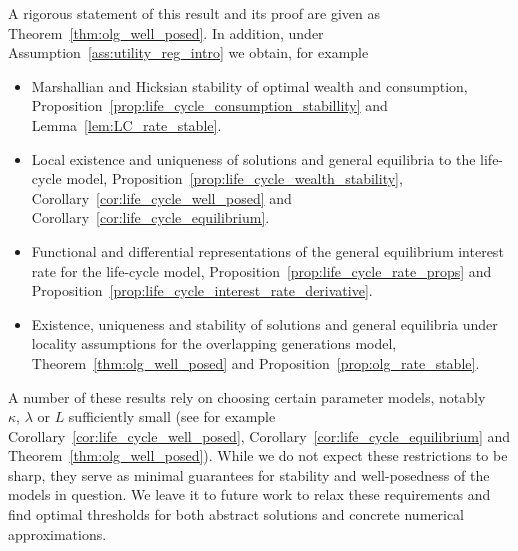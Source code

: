 \documentclass[11pt,oneside,english,reqno,dvipsnames,table]{amsart}
\numberwithin{equation}{section}
\theoremstyle{plain}
\theoremstyle{definition}
\theoremstyle{remark}
\theoremstyle{plain}
\theoremstyle{plain}
\theoremstyle{plain}
\theoremstyle{plain}
\theoremstyle{plain}
\theoremstyle{plain}
\theoremstyle{plain}
\numberwithin{thm}{section}
\begin{document}
%
A rigorous statement of this result and its proof are given as Theorem~\ref{thm:olg_well_posed}. In addition, under Assumption~\ref{ass:utility_reg_intro} we obtain, for example
%
\begin{itemize}
    \item Marshallian and Hicksian stability of optimal wealth and consumption, Proposition~\ref{prop:life_cycle_consumption_stabillity} and Lemma~\ref{lem:LC_rate_stable}.
    \item Local existence and uniqueness of solutions and general equilibria to the life-cycle model, Proposition~\ref{prop:life_cycle_wealth_stability},  Corollary~\ref{cor:life_cycle_well_posed} and Corollary~\ref{cor:life_cycle_equilibrium}.
    \item Functional and differential representations of the general equilibrium interest rate for the life-cycle model, Proposition~\ref{prop:life_cycle_rate_props} and Proposition~\ref{prop:life_cycle_interest_rate_derivative}.
    \item Existence, uniqueness and stability of solutions and general equilibria under locality assumptions for the overlapping generations model, Theorem~\ref{thm:olg_well_posed} and Proposition~\ref{prop:olg_rate_stable}.
\end{itemize}
%
A number of these results rely on choosing certain parameter models, notably $\kappa,\,\lambda$ or $L$ sufficiently small (see for example Corollary~\ref{cor:life_cycle_well_posed}, Corollary~\ref{cor:life_cycle_equilibrium} and Theorem~\ref{thm:olg_well_posed}). While we do not expect these restrictions to be sharp, they serve as minimal guarantees for stability and well-posedness of the models in question. We leave it to future work to relax these requirements and find optimal thresholds for both abstract solutions and concrete numerical approximations.
\end{document}
